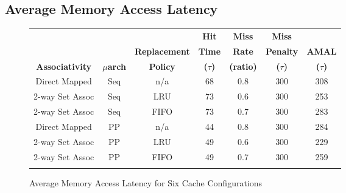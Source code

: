 \documentclass[10pt]{article}
\begin{document}
\subsection{Average Memory Access Latency}
\begin{figure}[H]
\centering
\begin{tabular}{@{\extracolsep{3pt}}ccccccc@{}}
\Xhline{2\arrayrulewidth}
& & & \textbf{Hit} & \textbf{Miss} & \textbf{Miss} & \\
& & \textbf{Replacement} & \textbf{Time} & \textbf{Rate} & \textbf{Penalty} & \textbf{AMAL} \\
\textbf{Associativity} & \textbf{$\mu$arch} & \textbf{Policy} & \textbf{($\tau$)} & \textbf{(ratio)} & \textbf{($\tau$)} & \textbf{($\tau$)} \\
\Xhline{2\arrayrulewidth}
Direct Mapped   & Seq & n/a & 68 & 0.8 & 300 & 308\\
2-way Set Assoc & Seq & LRU & 73 & 0.6 & 300 & 253\\
2-way Set Assoc & Seq & FIFO& 73 & 0.7 & 300 & 283\\
Direct Mapped   & PP  & n/a & 44 & 0.8 & 300 & 284\\
2-way Set Assoc & PP  & LRU & 49 & 0.6 & 300 & 229\\
2-way Set Assoc & PP  & FIFO& 49 & 0.7 & 300 & 259\\
\hline
\Xhline{2\arrayrulewidth}
\end{tabular}
\caption{Average Memory Access Latency for Six Cache Configurations}
\end{figure}
\end{document}
